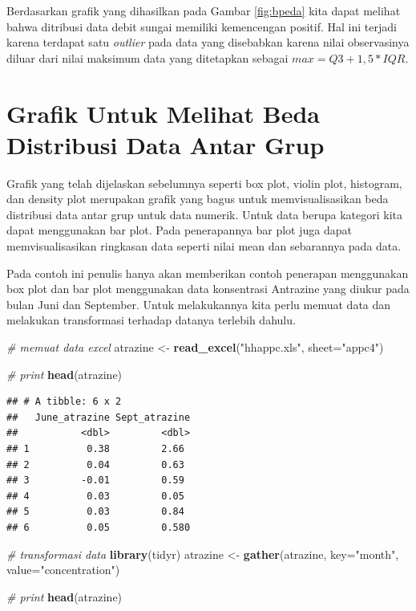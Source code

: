 \documentclass[]{book}
\newenvironment{Shaded}{\begin{snugshade}}{\end{snugshade}}
\newcommand{\KeywordTok}[1]{\textcolor[rgb]{0.13,0.29,0.53}{\textbf{#1}}}
\newcommand{\DataTypeTok}[1]{\textcolor[rgb]{0.13,0.29,0.53}{#1}}
\newcommand{\StringTok}[1]{\textcolor[rgb]{0.31,0.60,0.02}{#1}}
\newcommand{\CommentTok}[1]{\textcolor[rgb]{0.56,0.35,0.01}{\textit{#1}}}
\newcommand{\NormalTok}[1]{#1}
\begin{document}
Berdasarkan grafik yang dihasilkan pada Gambar \ref{fig:bpeda} kita
dapat melihat bahwa ditribusi data debit sungai memiliki kemencengan
positif. Hal ini terjadi karena terdapat satu \emph{outlier} pada data
yang disebabkan karena nilai observasinya diluar dari nilai maksimum
data yang ditetapkan sebagai \(max=Q3 + 1,5*IQR\).

\section{Grafik Untuk Melihat Beda Distribusi Data Antar
Grup}\label{grafik-untuk-melihat-beda-distribusi-data-antar-grup}

Grafik yang telah dijelaskan sebelumnya seperti box plot, violin plot,
histogram, dan density plot merupakan grafik yang bagus untuk
memvisualisasikan beda distribusi data antar grup untuk data numerik.
Untuk data berupa kategori kita dapat menggunakan bar plot. Pada
penerapannya bar plot juga dapat memvisualisasikan ringkasan data
seperti nilai mean dan sebarannya pada data.

Pada contoh ini penulis hanya akan memberikan contoh penerapan
menggunakan box plot dan bar plot menggunakan data konsentrasi Antrazine
yang diukur pada bulan Juni dan September. Untuk melakukannya kita perlu
memuat data dan melakukan transformasi terhadap datanya terlebih dahulu.

\begin{Shaded}
\begin{Highlighting}[]
\CommentTok{# memuat data excel}
\NormalTok{atrazine <-}\StringTok{ }\KeywordTok{read_excel}\NormalTok{(}\StringTok{"hhappc.xls"}\NormalTok{, }\DataTypeTok{sheet=}\StringTok{"appc4"}\NormalTok{)}

\CommentTok{# print}
\KeywordTok{head}\NormalTok{(atrazine)}
\end{Highlighting}
\end{Shaded}

\begin{verbatim}
## # A tibble: 6 x 2
##   June_atrazine Sept_atrazine
##           <dbl>         <dbl>
## 1          0.38         2.66 
## 2          0.04         0.63 
## 3         -0.01         0.59 
## 4          0.03         0.05 
## 5          0.03         0.84 
## 6          0.05         0.580
\end{verbatim}

\begin{Shaded}
\begin{Highlighting}[]
\CommentTok{# transformasi data}
\KeywordTok{library}\NormalTok{(tidyr)}
\NormalTok{atrazine <-}\StringTok{ }\KeywordTok{gather}\NormalTok{(atrazine,}
                 \DataTypeTok{key=}\StringTok{"month"}\NormalTok{,}
                 \DataTypeTok{value=}\StringTok{"concentration"}\NormalTok{)}

\CommentTok{# print}
\KeywordTok{head}\NormalTok{(atrazine)}
\end{Highlighting}
\end{Shaded}
\end{document}
